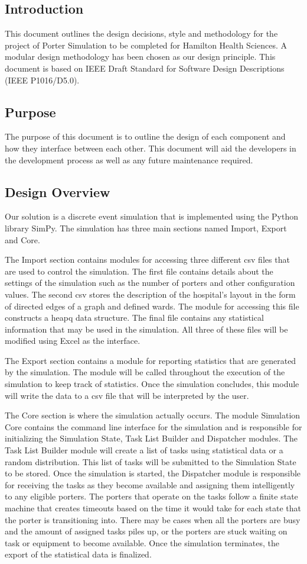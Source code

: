 \documentclass[paper=letter, fontsize=10pt]{scrartcl}
\numberwithin{equation}{section}		%
\numberwithin{figure}{section}			%
\numberwithin{table}{section}				%
\begin{document}
\subsection{Introduction}
This document outlines the design decisions, style and methodology for the project of Porter Simulation to be completed for Hamilton Health Sciences.  A modular design methodology has been chosen as our design principle.  This document is based on IEEE Draft Standard for Software Design Descriptions (IEEE P1016/D5.0).
\subsection{Purpose}
The purpose of this document is to outline the design of each component and how they interface between each other. This document will aid the developers in the development process as well as any future maintenance required.
\subsection{Design Overview}
Our solution is a discrete event simulation that is implemented using the Python library SimPy. The simulation has three main sections named Import, Export and Core. 

The Import section contains modules for accessing three different csv files that are used to control the simulation. The first file contains details about the settings of the simulation such as the number of porters and other configuration values. The second csv stores the description of the hospital's layout in the form of directed edges of a graph and defined wards. The module for accessing this file constructs a heapq data structure. The final file contains any statistical information that may be used in the simulation. All three of these files will be modified using Excel as the interface.

The Export section contains a module for reporting statistics that are generated by the simulation. The module will be called throughout the execution of the simulation to keep track of statistics. Once the simulation concludes, this module will write the data to a csv file that will be interpreted by the user.

The Core section is where the simulation actually occurs. The module Simulation Core contains the command line interface for the simulation and is responsible for initializing the Simulation State, Task List Builder and Dispatcher modules. The Task List Builder module will create a list of tasks using statistical data or a random distribution. This list of tasks will be submitted to the Simulation State to be stored. Once the simulation is started, the Dispatcher module is responsible for receiving the tasks as they become available and assigning them intelligently to any eligible porters. The porters that operate on the tasks follow a finite state machine that creates timeouts based on the time it would take for each state that the porter is transitioning into. There may be cases when all the porters are busy and the amount of assigned tasks piles up, or the porters are stuck waiting on task or equipment to become available. Once the simulation terminates, the export of the statistical data is finalized.
\end{document}
